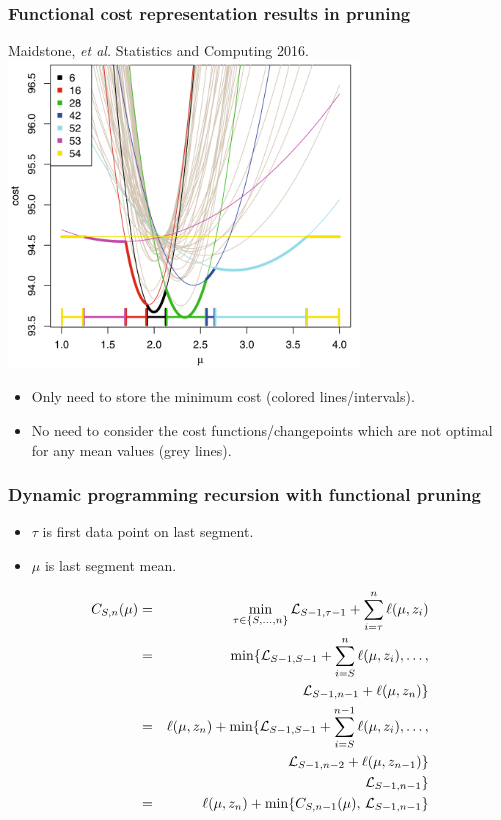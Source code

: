 \documentclass{beamer}
\begin{document}
\begin{frame}
  \frametitle{Functional cost representation results in pruning}
  
  Maidstone, {\it et al.} Statistics and Computing 2016.
\centering
\includegraphics[width=0.7\textwidth]{screenshot-Maidstone-figure-1}

\begin{itemize}
\item Only need to store the minimum cost (colored lines/intervals).
  \item No need to consider the cost functions/changepoints which are
    not optimal for any mean values (grey lines).
\end{itemize}
  
\end{frame}

\begin{frame}
  \frametitle{Dynamic programming recursion with functional pruning}
  \begin{itemize}
  \item $\tau$ is first data point on last segment.
  \item $\mu$ is last segment mean.
  \end{itemize}
  \begin{eqnarray*}
    C_{S,n}(\mu) &=&
    \min_{\tau\in\{S, \dots, n\} }
\mathcal L_{S-1, \tau-1}
 +
\sum_{i=\tau}^{n} \ell( \mu,  z_i)\\
&=&\min\{\mathcal L_{S-1,S-1} + \sum_{i=S}^{n} \ell( \mu,  z_i), \dots,\\
    &&\hskip 0.8cm \mathcal L_{S-1,n-1} + \ell( \mu,  z_n) \}\\
&=&\ell( \mu,  z_n) + \min\{\mathcal L_{S-1,S-1} + \sum_{i=S}^{n-1} \ell( \mu,  z_i), \dots,\\
    &&\hskip 2.7cm \mathcal L_{S-1,n-2}  +\ell( \mu,  z_{n-1})\}\\
    &&\hskip 2.7cm \mathcal L_{S-1,n-1}  \}\\
&=&\ell( \mu,  z_n)+
\min\{
    C_{S,n-1}(\mu),\,  
    \mathcal L_{S-1,n-1}
\}
  \end{eqnarray*}
\end{frame}
\end{document}

